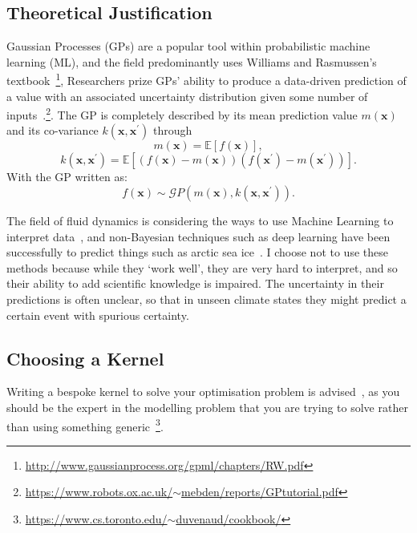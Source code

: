 \documentclass[usenames, dvipsnames, twocolumn]{article}
\begin{document}
\subsection{Theoretical Justification}


Gaussian Processes (GPs) are a popular tool within probabilistic machine learning (ML), and the field predominantly uses Williams and Rasmussen's textbook~\cite{williams2006gaussian}\footnote{\href{http://www.gaussianprocess.org/gpml/chapters/RW.pdf}{http://www.gaussianprocess.org/gpml/chapters/RW.pdf}},
Researchers prize GPs' ability to produce a data-driven prediction of a value with an associated uncertainty distribution given some number of inputs~\cite{ebden2008gaussian}.\footnote{ \href{https://www.robots.ox.ac.uk/~mebden/reports/GPtutorial.pdf}{https://www.robots.ox.ac.uk/$\sim$mebden/reports/GPtutorial.pdf}}. The GP is completely described by its mean prediction value \(m(\mathbf{x})\) and its co-variance \(k\left(\mathbf{x}, \mathbf{x}^{\prime}\right)\) through
\begin{equation}m(\mathbf{x})=\mathbb{E}[f(\mathbf{x})], \end{equation}\begin{equation}k\left(\mathbf{x}, \mathbf{x}^{\prime}\right)=\mathbb{E}\left[(f(\mathbf{x})-m(\mathbf{x}))\left(f\left(\mathbf{x}^{\prime}\right)-m\left(\mathbf{x}^{\prime}\right)\right)\right].\end{equation}
With the GP written as:
\begin{equation}f(\mathbf{x}) \sim \mathcal{G} P\left(m(\mathbf{x}), k\left(\mathbf{x}, \mathbf{x}^{\prime}\right)\right). \end{equation}

The field of fluid dynamics is considering the ways to use
Machine Learning to interpret data~\cite{brenner2019perspective},
and non-Bayesian techniques such as deep learning
have been successfully to predict things such as arctic sea
ice~\cite{ham2019deep, bolton2019applications}.
I choose not to use these methods because while they `work
well', they are very hard to interpret, and so their ability to
add scientific knowledge is impaired. The uncertainty in their
predictions is often unclear, so that in unseen climate states
they might predict a certain event with spurious certainty.

\subsection{Choosing a Kernel}
Writing a bespoke kernel to solve your optimisation problem is advised~\cite{duvenaud2014automatic},
as you should be the expert in the modelling problem that you are trying to
solve rather than using something generic~\cite{LeMaitre2019gaussian,
 duvenaud2014automatic}\footnote{\href{https://www.cs.toronto.edu/~duvenaud/cookbook/
}{https://www.cs.toronto.edu/$\sim$duvenaud/cookbook/}}.
\end{document}
